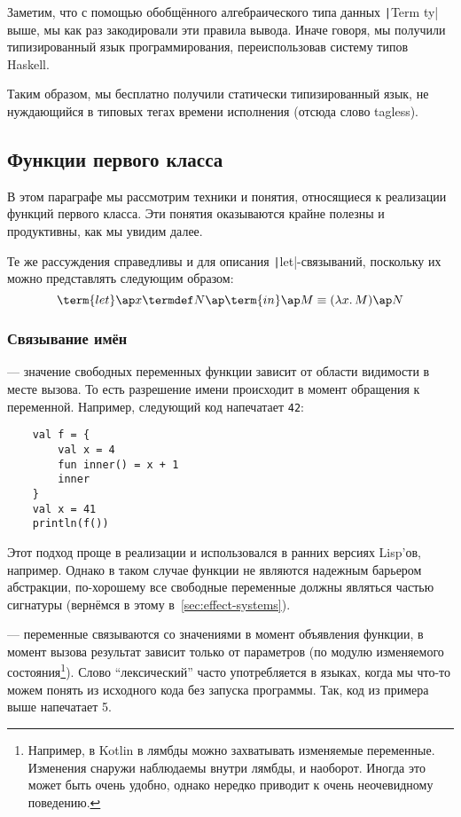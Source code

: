 Заметим, что с помощью обобщённого алгебраического типа данных \texttt|Term ty| выше, мы как раз закодировали эти правила вывода.
Иначе говоря, мы получили типизированный язык программирования, переиспользовав систему типов Haskell.

Таким образом, мы бесплатно получили статически типизированный язык, не нуждающийся в типовых тегах времени исполнения (отсюда слово tagless).


\subsection{Функции первого класса} \label{subsec:first-class-functions}

В этом параграфе мы рассмотрим техники и понятия, относящиеся к реализации функций первого класса.
Эти понятия оказываются крайне полезны и продуктивны, как мы увидим далее.

Те же рассуждения справедливы и для описания \texttt|let|-связываний, поскольку их можно представлять следующим образом:
\[
    \term{let} \ap x \termdef N \ap \term{in} \ap M \equiv (\lambda x\ldotp M) \ap N
\]

\subsubsection{Связывание имён}

 --- значение свободных переменных функции зависит от области видимости в месте вызова.
То есть разрешение имени происходит в момент обращения к переменной.
Например, следующий код напечатает \texttt{42}:
\begin{verbatim}
    val f = {
        val x = 4
        fun inner() = x + 1
        inner
    }
    val x = 41
    println(f())
\end{verbatim}

Этот подход проще в реализации и использовался в ранних версиях Lisp'ов, например.
Однако в таком случае функции не являются надежным барьером абстракции, по-хорошему все свободные переменные должны являться частью сигнатуры (вернёмся в этому в~\ref{sec:effect-systems}).

 --- переменные связываются со значениями в момент объявления функции, в момент вызова результат зависит только от параметров (по модулю изменяемого состояния\footnote{Например, в Kotlin в лямбды можно захватывать изменяемые переменные. Изменения снаружи наблюдаемы внутри лямбды, и наоборот. Иногда это может быть очень удобно, однако нередко приводит к очень неочевидному поведению.}).
Слово ``лексический'' часто употребляется в языках, когда мы что-то можем понять из исходного кода без запуска программы.
Так, код из примера выше напечатает 5.

